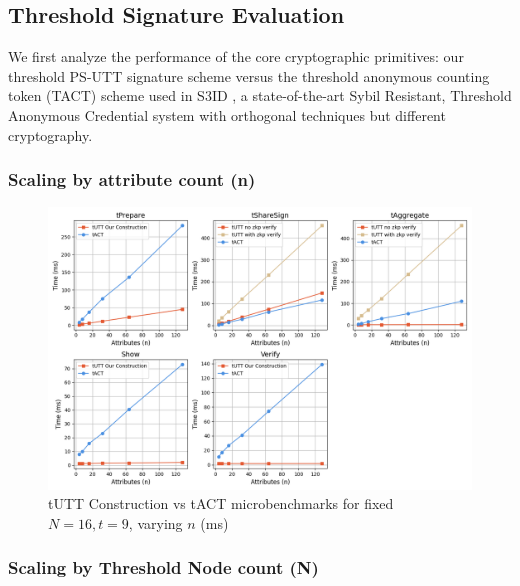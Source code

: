 \subsection{Threshold Signature Evaluation}
We first analyze the performance of the core cryptographic primitives: our threshold PS-UTT signature scheme versus the threshold anonymous counting token (TACT) scheme used in S3ID \cite{rabaninejad_attribute-based_2024}, a state-of-the-art Sybil Resistant, Threshold Anonymous Credential system with orthogonal techniques but different cryptography.

\subsubsection{Scaling by attribute count (n)}
\begin{figure}[ht]
    \centering
    \includegraphics[width=1\linewidth]{figures/chap5_tutt_scale_by_n_attributes.png}
    \caption[tUTT our selected construction improves on 4/5 key metrics scaling credential attribute count (n)]{tUTT Construction vs tACT microbenchmarks for fixed $ N = 16, t = 9 $, varying $n$ (ms)}
    \label{fig:chap4_tutt_tact_microbenchmarks}
\end{figure}

\subsubsection{Scaling by Threshold Node count (N)}

